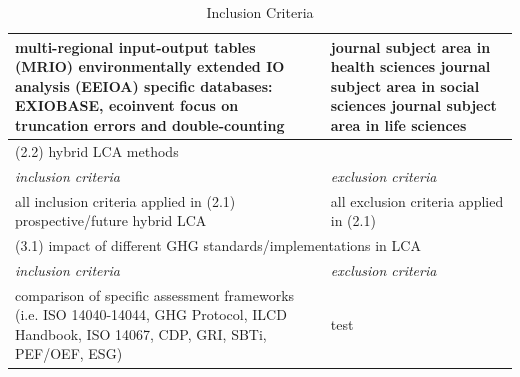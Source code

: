 \documentclass{article}
\begin{document}
\begin{table}[htbp]
\begin{tabularx}{\textwidth}{| X | X |}
                        multi-regional input-output tables (MRIO) \newline
                        environmentally extended IO analysis (EEIOA) \newline
                        specific databases: EXIOBASE, ecoinvent \newline
                        focus on truncation errors and double-counting
                    &
                        journal subject area in health sciences \newline
                        journal subject area in social sciences \newline
                        journal subject area in life sciences
                    \\
                    \hline
                \multicolumn{2}{|l|}{(2.2) hybrid LCA methods}  \\
                    \hline
                    \textit{inclusion criteria} & \textit{exclusion criteria} \\
                    \hline
                        all inclusion criteria applied in (2.1) \newline
                        prospective/future hybrid LCA
                    &
                        all exclusion criteria applied in (2.1)
                    \\
                    \hline
                \multicolumn{2}{|l|}{(3.1) impact of different GHG standards/implementations in LCA}  \\
                    \hline
                    \textit{inclusion criteria} & \textit{exclusion criteria} \\
                    \hline
                        comparison of specific assessment frameworks \newline
                        (i.e. ISO 14040-14044, GHG Protocol, ILCD Handbook, ISO 14067, CDP, GRI, SBTi, PEF/OEF, ESG)
                    &
                        test
                    \\
                    \hline
                \end{tabularx}
                \caption{Inclusion Criteria}
            \end{table}

\newpage



\end{document}
